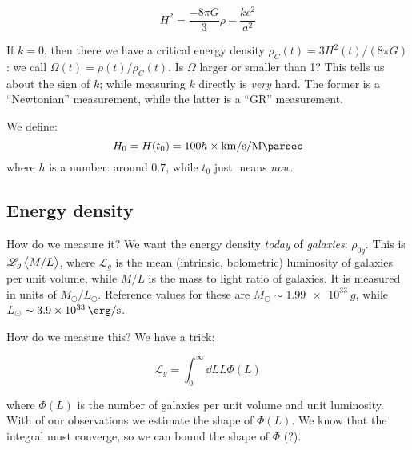 \documentclass[main.tex]{subfiles}
\begin{document}
\begin{equation}
  H^2 = \frac{-8 \pi G}{3} \rho - \frac{kc^2}{a^2}
\end{equation}

If \(k=0\), then there we have a critical energy density \(\rho_C (t) = 3 H^2 (t) / (8 \pi G)\): we call \(\Omega(t) = \rho(t) / \rho_C(t)\).
Is \(\Omega\) larger or smaller than 1? This tells us about the sign of \(k\); while measuring \(k\) directly is \emph{very} hard. The former is a ``Newtonian'' measurement, while the latter is a ``GR'' measurement.

We define:
\begin{equation}
  H_0 = H(t_0) = 100 h \times \SI{}{\kilo\metre\per\second\per\mega\parsec}
\end{equation}
%
where \(h\) is a number: around \(0.7\), while  \(t_0\) just means \emph{now}.

\subsection{Energy density}

How do we measure it? We want the energy density \emph{today} of \emph{galaxies}: \(\rho_{0g}\).
This is \(\mathscr L_g \expval{M/L} \), where \(\mathscr L _g\) is the mean (intrinsic, bolometric) luminosity of galaxies per unit volume, while \(M/L\) is the mass to light ratio of galaxies.
It is measured in units of \(M_{\odot} / L_{\odot}\). Reference values for these are \(M_{\odot} \sim \SI{1.99e33}{g}\), while \(L_\odot \sim \SI{3.9e33}{\erg\per\second} \).

How do we measure this? We have a trick:

\begin{equation}
  \mathscr L _g = \int_0^\infty \dd{L} L \Phi(L)
\end{equation}

where \(\Phi(L)\) is the number of galaxies per unit volume and unit luminosity. With of our observations we estimate the shape of \(\Phi(L)\). We know that the integral must converge, so we can bound the shape of \(\Phi\) (?).
\end{document}
